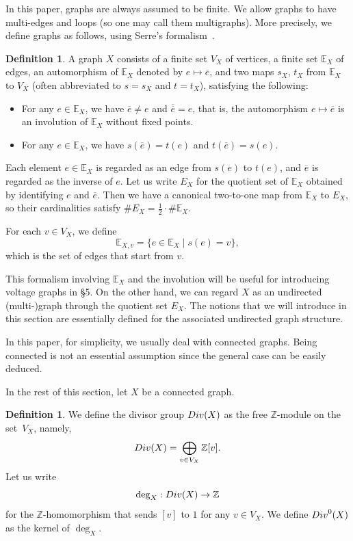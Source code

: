 \documentclass[11pt]{article}
\theoremstyle{definition}
\newtheorem{defi}[theo]{Definition}
\numberwithin{equation}{section}
\newcommand{\Z}{\mathbb{Z}}
\newcommand{\bE}{\mathbb{E}}
\newcommand{\ol}[1]{\overline{#1}}
\newcommand{\Div}{{\rm Div}}
\begin{document}
In this paper, graphs are always assumed to be finite.
We allow graphs to have multi-edges and loops (so one may call them multigraphs).
More precisely, we define graphs as follows, using Serre's formalism~\cite[Chapter I, \S 2.1]{Ser80}.

\begin{defi}
A graph $X$ consists of a finite set $V_X$ of vertices, a finite set $\bE_X$ of edges, an automorphism of $\bE_X$ denoted by $e \mapsto \ol{e}$, and two maps $s_X$, $t_X$ from $\bE_X$ to $V_X$ (often abbreviated to $s = s_X$ and $t = t_X$), satisfying the following:
\begin{itemize}
\item
For any $e \in \bE_X$, we have $\ol{e} \neq e$ and $\ol{\ol{e}} = e$, that is, the automorphism $e \mapsto \ol{e}$ is an involution of $\bE_X$ without fixed points.
\item
For any $e \in \bE_X$, we have $s(\ol{e}) = t(e)$ and $t(\ol{e}) = s(e)$.
\end{itemize}

Each element $e \in \bE_X$ is regarded as an edge from $s(e)$ to $t(e)$, and $\ol{e}$ is regarded as the inverse of $e$.
Let us write $E_X$ for the quotient set of $\bE_X$ obtained by identifying $e$ and $\ol{e}$.
Then we have a canonical two-to-one map from $\bE_X$ to $E_X$, so their cardinalities satisfy $\# E_X = \frac{1}{2} \cdot \# \bE_X$.

For each $v \in V_X$, we define
\[
\bE_{X, v} = \{ e \in \bE_X \mid s(e) = v\},
\]
which is the set of edges that start from $v$.
\end{defi}

This formalism involving $\bE_X$ and the involution will be useful for introducing voltage graphs in \S5.
On the other hand, we can regard $X$ as an undirected \mbox{(multi-)}graph through the quotient set $E_X$.
The notions that we will introduce in this section are essentially defined for the associated undirected graph structure.


In this paper, for simplicity, we usually deal with connected graphs.
Being connected is not an essential assumption since the general case can be easily deduced.

In the rest of this section, let $X$ be a connected graph.

\begin{defi}
We define the divisor group $\Div(X)$ as the free $\Z$-module on the set~$V_X$, namely, 
\[
\Div(X) = \bigoplus_{v \in V_X} \Z [v].
\]
Let us write
\[
\deg_X: \Div(X) \to \Z
\]
for the $\Z$-homomorphism that sends $[v]$ to $1$ for any $v \in V_X$.
We define $\Div^0(X)$ as the kernel of $\deg_X$.
\end{defi}
\end{document}
